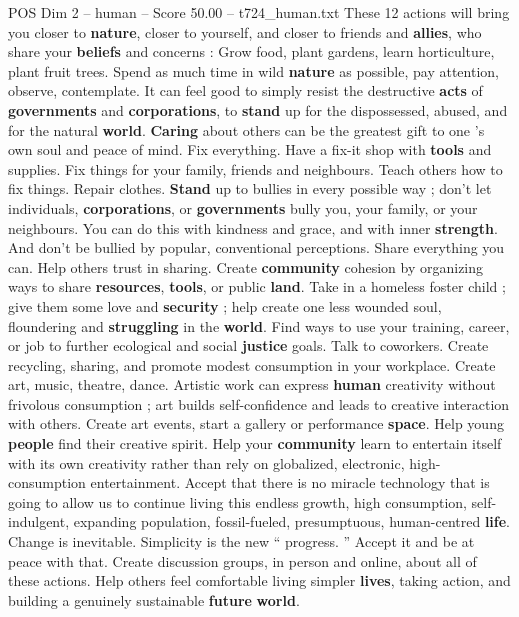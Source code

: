 \begin{textsample}{POS Dim 2 – human – Score 50.00 – t724\_human.txt}
These 12 actions will bring you closer to \textbf{nature}, closer to yourself, and closer to friends and \textbf{allies}, who share your \textbf{beliefs} and concerns : Grow food, plant gardens, learn horticulture, plant fruit trees.
Spend as much time in wild \textbf{nature} as possible, pay attention, observe, contemplate.
It can feel good to simply resist the destructive \textbf{acts} of \textbf{governments} and \textbf{corporations}, to \textbf{stand} up for the dispossessed, abused, and for the natural \textbf{world}. \textbf{Caring} about others can be the greatest gift to one ’s own soul and peace of mind.
Fix everything.
Have a fix-it shop with \textbf{tools} and supplies.
Fix things for your family, friends and neighbours.
Teach others how to fix things.
Repair clothes. \textbf{Stand} up to bullies in every possible way ; don't let individuals, \textbf{corporations}, or \textbf{governments} bully you, your family, or your neighbours.
You can do this with kindness and grace, and with inner \textbf{strength}.
And don't be bullied by popular, conventional perceptions.
Share everything you can.
Help others trust in sharing.
Create \textbf{community} cohesion by organizing ways to share \textbf{resources}, \textbf{tools}, or public \textbf{land}.
Take in a homeless foster child ; give them some love and \textbf{security} ; help create one less wounded soul, floundering and \textbf{struggling} in the \textbf{world}.
Find ways to use your training, career, or job to further ecological and social \textbf{justice} goals.
Talk to coworkers.
Create recycling, sharing, and promote modest consumption in your workplace.
Create art, music, theatre, dance.
Artistic work can express \textbf{human} creativity without frivolous consumption ; art builds self-confidence and leads to creative interaction with others.
Create art events, start a gallery or performance \textbf{space}.
Help young \textbf{people} find their creative spirit.
Help your \textbf{community} learn to entertain itself with its own creativity rather than rely on globalized, electronic, high-consumption entertainment.
Accept that there is no miracle technology that is going to allow us to continue living this endless growth, high consumption, self-indulgent, expanding population, fossil-fueled, presumptuous, human-centred \textbf{life}.
Change is inevitable.
Simplicity is the new “ progress. ” Accept it and be at peace with that.
Create discussion groups, in person and online, about all of these actions.
Help others feel comfortable living simpler \textbf{lives}, taking action, and building a genuinely sustainable \textbf{future} \textbf{world}.

\end{textsample}

